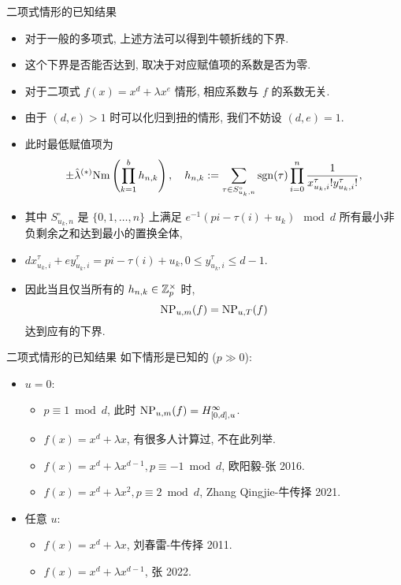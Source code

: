 \documentclass[aspectratio=169,handout]{ctexbeamer}
\begin{document}
\begin{frame}{二项式情形的已知结果}
	\begin{itemize}
		\item 对于一般的多项式, 上述方法可以得到牛顿折线的下界.
		\item 这个下界是否能否达到, 取决于对应赋值项的系数是否为零.
		\item 对于二项式 $f(x)=x^d+\lambda x^e$ 情形, 相应系数与 $f$ 的系数无关.
		\item 由于 $(d,e)>1$ 时可以化归到扭的情形, 我们不妨设 $(d,e)=1$.
		\item 此时最低赋值项为
		\[
			\pm\hat\lambda^{(*)}{\mathrm{Nm}}\left(\prod_{k=1}^b h_{n,k}\right),\quad
			h_{n,k}:=\sum_{\tau\in S_{u_k,n}^\circ}\operatorname{sgn}(\tau)\prod_{i=0}^n\frac{1}{x_{u_k,i}^\tau!y_{u_k,i}^\tau!},
		\]
		\item 其中 $S_{u_k,n}^\circ$ 是 $\{0,1,\dots,n\}$ 上满足 $e^{-1}(pi-\tau(i)+u_k)\mod d$ 所有最小非负剩余之和达到最小的置换全体,
		\item $dx_{u_k,i}^\tau+ey_{u_k,i}^\tau=pi-\tau(i)+u_k,0\le y_{u_k,i}^\tau\le d-1$.
		\item 因此当且仅当所有的 $h_{n,k}\in{\mathbb{Z}}_p^\times$ 时,
		\[
			{\mathrm{NP}}_{u,m}(f)={\mathrm{NP}}_{u,T}(f)
		\]
		达到应有的下界.
	\end{itemize}
\end{frame}


\begin{frame}{二项式情形的已知结果}
	如下情形是已知的 ($p\gg0$):
	\begin{itemize}
		\item $u=0$:
		\begin{itemize}
			\item $p\equiv 1\bmod d$, 此时 ${\mathrm{NP}}_{u,m}(f)=H_{[0,d],u}^\infty$.
			\item $f(x)=x^d+\lambda x$, 有很多人计算过, 不在此列举.
			\item $f(x)=x^d+\lambda x^{d-1},p\equiv -1\bmod d$, 欧阳毅-张 2016.
			\item $f(x)=x^d+\lambda x^2,p\equiv 2\bmod d$, Zhang Qingjie-牛传择 2021.
		\end{itemize}
		\item 任意 $u$:
		\begin{itemize}
			\item $f(x)=x^d+\lambda x$, 刘春雷-牛传择 2011.
			\item $f(x)=x^d+\lambda x^{d-1}$, 张 2022.
		\end{itemize}
	\end{itemize}
\end{frame}
\end{document}
